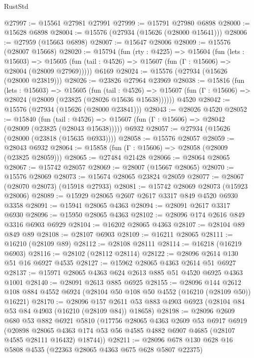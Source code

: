 \begin{lexlean}{RustStd}
\begin{coremodule}
@27997 := @15561 @27981 @27991
@27999 := @15791 @27980 @6898
@28000 := @15628 @6898
@28004 := @15576 (@27934 (@15626 (@28000 @15641)))
@28006 := @27959 (@15663 @6898)
@28007 := @15647 @28006
@28009 := @15576 (@28007 @15668)
@28020 := @15794
    (fun (rty : @4225) =>
    @15604
      (fun (lets : @15603) =>
      @15605 (fun (tail : @4526) => @15607 (fun (Γ : @15606) => @28004 (@28009 @27969)))))
    @6169
@28024 := @15576 (@27934 (@15626 (@28000 @23819)))
@28026 := @23826 @27964 @23969
@28038 := @15816
    (fun (lets : @15603) =>
    @15605
      (fun (tail : @4526) =>
      @15607 (fun (Γ : @15606) => @28024 (@28009 (@23825 (@28026 @15636 @15638))))))
    @4520
@28042 := @15576 (@27934 (@15626 (@28000 @23841)))
@28043 := @28026 @4520
@28052 := @15840
    (fun (tail : @4526) => @15607 (fun (Γ : @15606) => @28042 (@28009 (@23825 (@28043 @15638)))))
    @6932
@28057 := @27934 (@15626 (@28000 (@23818 (@15635 @6933))))
@28058 := @15576 @28057
@28059 := @28043 @6932
@28064 := @15858 (fun (Γ : @15606) => @28058 (@28009 (@23825 @28059)))
@28065 := @27484 @21428
@28066 := @28064 @28065
@28067 := @15742 @28057
@28069 := @28007 (@15667 @28065)
@28070 := @15576 @28069
@28073 := @15674 @28065 @23824 @28059
@28077 := @28067 (@28070 @28073) (@15918 @27933)
@28081 := @15742 @28069 @28073 (@15923 @28006)
@28089 := @15929 @28065 @2607 @2617 @3317 @849 @4520 @6930 @3358
@28091 := @15941 @28065 @4363
@28094 := @28091 @2617 @3317 @6930
@28096 := @15950 @28065 @4363
@28102 := @28096 @174 @2616 @849 @3316 @6903 @6929
@28104 := @16202 @28065 @4363
@28107 := @28104 @89 @849 @89
@28108 := @28107 @6903
@28109 := @16211 @28065
@28111 := @16210 (@28109 @89)
@28112 := @28108 @28111
@28114 := @16218 (@16219 @6903)
@28116 := @28102 (@28112 @28114)
@28122 := @28096 @2614 @130 @51 @16 @6927 @4535
@28127 := @15962 @28065 @4363 @2614 @51 @6927
@28137 := @15971 @28065 @4363 @624 @2613 @885 @51 @4520 @6925 @4363 @1001
@28140 := @28091 @2613 @885 @6925
@28155 := @28096
    @144
    @2612
    @108
    @884
    @4552
    @6924
    (@28104 @50 @108 @50 @4552 (@16210 (@28109 @50)) @16221)
@28170 := @28096
    @157
    @2611
    @53
    @883
    @4903
    @6923
    (@28104 @84 @53 @84 @4903 (@16210 (@28109 @84)) @18658)
@28198 := @28096
    @2609
    @680
    @53
    @882
    @6921
    @5810
    (@17756
      @28065
      @4363
      @2609
      @53
      @6917
      @6919
      (@20898
        @28065
        @4363
        @174
        @53
        @56
        @4585
        @4882
        @6907
        @4685
        (@28107 @4585 @28111 @16432)
        @18744))
@28211 := @28096 @678 @130 @628 @16 @5808 @4535 (@22363 @28065 @4363 @675 @628 @5807 @22375)

\end{coremodule}
\end{lexlean}
